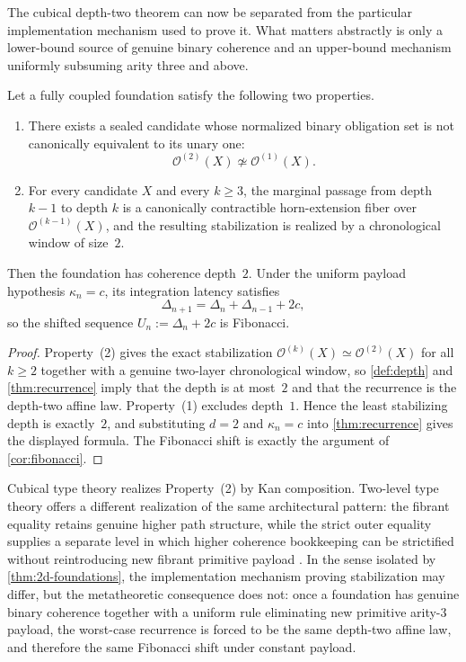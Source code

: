 \documentclass{lmcs}
\newcommand{\Ocal}{\mathcal{O}}
\begin{document}
The cubical depth-two theorem can now be separated from the particular implementation mechanism used to prove it. What matters abstractly is only a lower-bound source of genuine binary coherence and an upper-bound mechanism uniformly subsuming arity three and above.

\begin{thm}
\label{thm:2d-foundations}
Let a fully coupled foundation satisfy the following two properties.
\begin{enumerate}
  \item There exists a sealed candidate whose normalized binary obligation set is not canonically equivalent to its unary one:
  \[
    \Ocal^{(2)}(X) \not\simeq \Ocal^{(1)}(X).
  \]
  \item For every candidate $X$ and every $k \geq 3$, the marginal passage from depth $k-1$ to depth $k$ is a canonically contractible horn-extension fiber over $\Ocal^{(k-1)}(X)$, and the resulting stabilization is realized by a chronological window of size~$2$.
\end{enumerate}
Then the foundation has coherence depth~$2$. Under the uniform payload hypothesis $\kappa_n=c$, its integration latency satisfies
\[
  \Delta_{n+1} = \Delta_n + \Delta_{n-1} + 2c,
\]
so the shifted sequence $U_n := \Delta_n + 2c$ is Fibonacci.
\end{thm}

\begin{proof}
Property~(2) gives the exact stabilization $\Ocal^{(k)}(X) \simeq \Ocal^{(2)}(X)$ for all $k \geq 2$ together with a genuine two-layer chronological window, so \autoref{def:depth} and \autoref{thm:recurrence} imply that the depth is at most~$2$ and that the recurrence is the depth-two affine law. Property~(1) excludes depth~$1$. Hence the least stabilizing depth is exactly~$2$, and substituting $d=2$ and $\kappa_n=c$ into \autoref{thm:recurrence} gives the displayed formula. The Fibonacci shift is exactly the argument of \autoref{cor:fibonacci}.
\end{proof}

Cubical type theory realizes Property~(2) by Kan composition. Two-level type theory offers a different realization of the same architectural pattern: the fibrant equality retains genuine higher path structure, while the strict outer equality supplies a separate level in which higher coherence bookkeeping can be strictified without reintroducing new fibrant primitive payload \cite{altenkirch-strict,annenkov-2ltt}. In the sense isolated by \autoref{thm:2d-foundations}, the implementation mechanism proving stabilization may differ, but the metatheoretic consequence does not: once a foundation has genuine binary coherence together with a uniform rule eliminating new primitive arity-$3$ payload, the worst-case recurrence is forced to be the same depth-two affine law, and therefore the same Fibonacci shift under constant payload.
\end{document}
